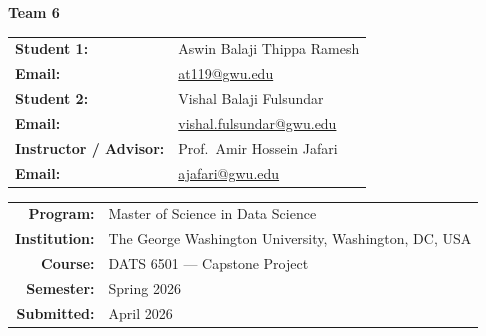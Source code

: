 \documentclass[12pt,a4paper]{article}
\begin{document}
\begin{titlepage}
  \begin{center}
  \begin{tcolorbox}[colback=lightblue,colframe=gwublue,width=0.85\textwidth,boxrule=1pt]
    \begin{center}
      {\large\bfseries\color{gwublue} Team 6}\\[0.5em]
      \begin{tabular}{ll}
        \textbf{Student 1:} & Aswin Balaji Thippa Ramesh \\
        \textbf{Email:}     & \href{mailto:at119@gwu.edu}{at119@gwu.edu} \\[0.4em]
        \textbf{Student 2:} & Vishal Balaji Fulsundar \\
        \textbf{Email:}     & \href{mailto:vishal.fulsundar@gwu.edu}{vishal.fulsundar@gwu.edu} \\[0.6em]
        \textbf{Instructor / Advisor:} & Prof.\ Amir Hossein Jafari \\
        \textbf{Email:}     & \href{mailto:ajafari@gwu.edu}{ajafari@gwu.edu}
      \end{tabular}
    \end{center}
  \end{tcolorbox}
  \end{center}

  \vfill

  \begin{center}
    \begin{tabular}{rl}
      \textbf{Program:}      & Master of Science in Data Science \\
      \textbf{Institution:}  & The George Washington University, Washington, DC, USA \\
      \textbf{Course:}       & DATS 6501 — Capstone Project \\
      \textbf{Semester:}     & Spring 2026 \\
      \textbf{Submitted:}    & April 2026 \\
    \end{tabular}
  \end{center}

  \vspace{0.3cm}

  \noindent
  \colorbox{gwublue}{}

\end{titlepage}
\end{document}

